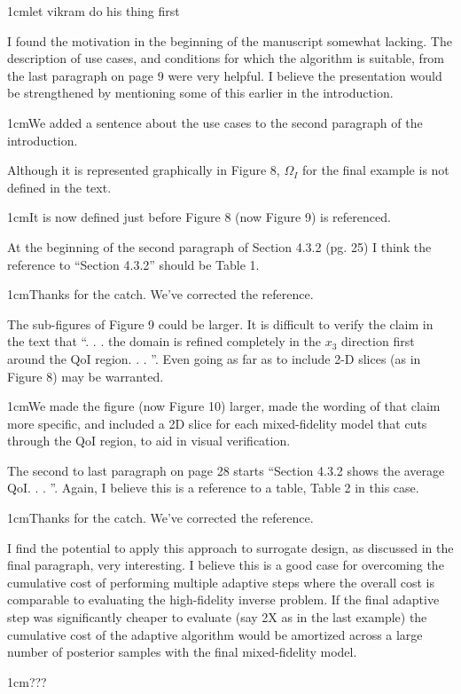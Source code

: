 \documentclass[12pt, letterpaper]{article}
\newcommand{\answer}[1]{\begin{adjustwidth}{1cm}{}{\color{blue}#1}\end{adjustwidth}}
\newcommand{\notdone}{{\color{red}{Changes not yet made.}}}
\begin{document}
\answer{let vikram do his thing first}
\notdone

I found the motivation in the beginning of the manuscript somewhat lacking. The description of use
cases, and conditions for which the algorithm is suitable, from the last paragraph on page 9 were very
helpful. I believe the presentation would be strengthened by mentioning some of this earlier in the
introduction.

\answer{We added a sentence about the use cases to the second paragraph of the introduction.}

Although it is represented graphically in Figure 8, $\Omega_I$ for the final example is not defined in the text.

\answer{It is now defined just before Figure 8 (now Figure 9) is referenced.}

At the beginning of the second paragraph of Section 4.3.2 (pg. 25) I think the reference to “Section
4.3.2” should be Table 1.

\answer{Thanks for the catch. We've corrected the reference.}

The sub-figures of Figure 9 could be larger. It is difficult to verify the claim in the text that “. . . the
domain is refined completely in the $x_3$ direction first around the QoI region. . . ”. Even going as far as
to include 2-D slices (as in Figure 8) may be warranted.

\answer{We made the figure (now Figure 10) larger, made the wording of that claim more specific, and included a 2D slice for each mixed-fidelity model that cuts through the QoI region, to aid in visual verification.}

The second to last paragraph on page 28 starts “Section 4.3.2 shows the average QoI. . . ”. Again, I
believe this is a reference to a table, Table 2 in this case.

\answer{Thanks for the catch. We've corrected the reference.}

I find the potential to apply this approach to surrogate design, as discussed in the final paragraph, very
interesting. I believe this is a good case for overcoming the cumulative cost of performing multiple
adaptive steps where the overall cost is comparable to evaluating the high-fidelity inverse problem.
If the final adaptive step was significantly cheaper to evaluate (say 2X as in the last example) the
cumulative cost of the adaptive algorithm would be amortized across a large number of posterior
samples with the final mixed-fidelity model.

\answer{???}
\end{document}
